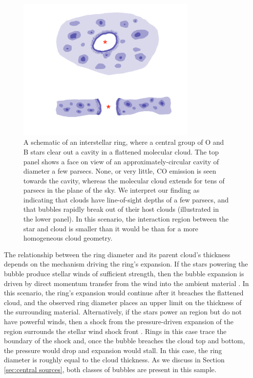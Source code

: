 \begin{figure}
\includegraphics[width=3.5in]{bubble_schematic}
\caption{A schematic of an interstellar ring, where a central group of O and B stars clear out a cavity in a flattened molecular cloud.
The top panel shows a face on view of an approximately-circular cavity of diameter a few parsecs. None, or very little, CO emission
is seen towards the cavity, whereas the molecular cloud extends for tens of parsecs in the plane of the sky. We interpret our finding
as indicating that clouds have line-of-sight depths of a few parsecs, and that bubbles rapidly break out of their host clouds
(illustrated in the lower panel).
In this scenario, the interaction region between the star and cloud is smaller than it would be than for a more homogeneous cloud geometry.
}
\label{fig:schematic}
\end{figure}


The relationship between the ring diameter and its parent cloud's thickness depends on
the mechanism driving the ring's expansion. If the stars powering the bubble produce
stellar winds of sufficient strength, then the bubble expansion is driven by direct momentum
transfer from the wind into the ambient material \citep{Castor75}. In this scenario, the ring's expansion would continue after
it breaches the flattened cloud, and the observed ring diameter places an upper limit
on the thickness of the surrounding material. Alternatively, if the stars power an \hii region
but do not have powerful winds, then a shock from the pressure-driven expansion of the \hii region surrounds the
stellar wind shock front \citep{Freyer03}.  Rings in this case trace the boundary of the \hii shock and, once the bubble
breaches the cloud top and bottom, the pressure would drop and expansion would stall. In this
case, the ring diameter is roughly equal to the cloud thickness. As we discuss in Section \ref{sec:central sources},
both classes of bubbles are present in this sample.

